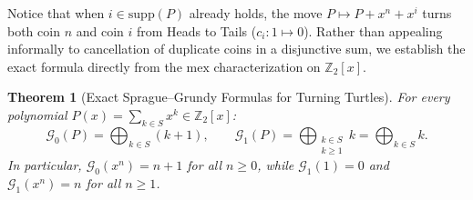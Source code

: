 \documentclass[11pt,a4paper]{article}
\newtheorem{theorem}{Theorem}[section]
\theoremstyle{definition}
\newcommand{\Z}{\mathbb{Z}}
\newcommand{\SG}{\mathcal{G}}
\newcommand{\mex}{\mathrm{mex}}
\newcommand{\supp}{\mathrm{supp}}
\begin{document}
Notice that when $i \in \supp(P)$ already holds, the move $P \mapsto P + x^n + x^i$ turns
both coin $n$ and coin $i$ from Heads to Tails ($c_i : 1 \mapsto 0$). Rather than appealing
informally to cancellation of duplicate coins in a disjunctive sum, we establish the exact
formula directly from the $\mex$ characterization on $\Z_2[x]$.

\begin{theorem}[Exact Sprague--Grundy Formulas for Turning Turtles]
\label{thm:sg-exact}
For every polynomial $P(x) = \sum_{k \in S} x^k \in \Z_2[x]$:
\begin{equation}
\label{eq:sg-formulas}
  \SG_0(P) = \bigoplus_{k \in S} (k + 1), \qquad
  \SG_1(P) = \bigoplus_{\substack{k \in S \\ k \ge 1}} k = \bigoplus_{k \in S} k.
\end{equation}
In particular, $\SG_0(x^n) = n + 1$ for all $n \ge 0$, while $\SG_1(1) = 0$ and
$\SG_1(x^n) = n$ for all $n \ge 1$.
\end{theorem}
\end{document}

